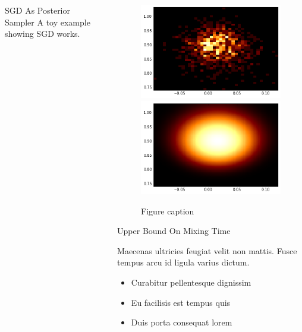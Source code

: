 \documentclass[final]{beamer}
\newlength{\sepwid}
\newlength{\onecolwid}
\begin{document}
\begin{frame}[t]
\begin{columns}[t]
\begin{column}{\onecolwid}
\begin{block}{SGD As Posterior Sampler}
A toy example showing SGD works.

\end{block}


\end{column} %

\begin{column}{\sepwid}\end{column} %

\begin{column}{\onecolwid} %



\begin{figure}
\includegraphics[width=0.4\linewidth]{../figure/simulation2_empirical.png}
\includegraphics[width=0.4\linewidth]{../figure/simulation2_real.png}
\caption{Figure caption}
\end{figure}



\begin{block}{Upper Bound On Mixing Time}

Maecenas ultricies feugiat velit non mattis. Fusce tempus arcu id ligula varius dictum.
\begin{itemize}
\item Curabitur pellentesque dignissim
\item Eu facilisis est tempus quis
\item Duis porta consequat lorem
\end{itemize}


\end{block}
\end{column}
\end{columns}
\end{frame}
\end{document}
